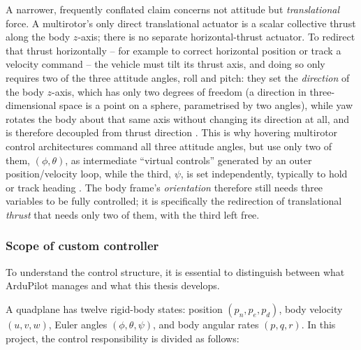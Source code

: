 \documentclass{article}
\begin{document}
A narrower, frequently conflated claim concerns not attitude but \emph{translational} force. A multirotor's only direct translational actuator is a scalar collective thrust along the body $z$-axis; there is no separate horizontal-thrust actuator. To redirect that thrust horizontally -- for example to correct horizontal position or track a velocity command -- the vehicle must tilt its thrust axis, and doing so only requires two of the three attitude angles, roll and pitch: they set the \emph{direction} of the body $z$-axis, which has only two degrees of freedom (a direction in three-dimensional space is a point on a sphere, parametrised by two angles), while yaw rotates the body about that same axis without changing its direction at all, and is therefore decoupled from thrust direction \citep{mahony2012multirotor}. This is why hovering multirotor control architectures command all three attitude angles, but use only two of them, $(\phi,\theta)$, as intermediate ``virtual controls'' generated by an outer position/velocity loop, while the third, $\psi$, is set independently, typically to hold or track heading \citep{mahony2012multirotor,beardmclain2012}. The body frame's \emph{orientation} therefore still needs three variables to be fully controlled; it is specifically the redirection of translational \emph{thrust} that needs only two of them, with the third left free.

\subsubsection{Scope of custom controller}
\label{sec:controlled-states}
To understand the control structure, it is essential to distinguish between what ArduPilot manages and what this thesis develops. 

A quadplane has twelve rigid-body states: position $(p_n, p_e, p_d)$, body velocity $(u, v, w)$, Euler angles $(\phi, \theta, \psi)$, and body angular rates $(p, q, r)$. In this project, the control responsibility is divided as follows:
\end{document}

